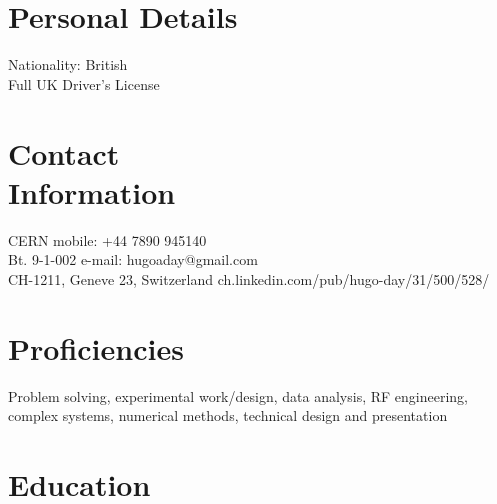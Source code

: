 \documentclass[margin,line]{resume}
\begin{document}
\begin{resume}

    \section{\mysidestyle Personal Details}
    Nationality: British \vspace{0mm}\\\vspace{-4.5mm}%
    Full UK Driver's License  \vspace{0mm}\\\vspace{-4.5mm}%


    \section{\mysidestyle Contact\\Information}
    CERN                            \hfill mobile: +44 7890 945140          \vspace{0mm}\\\vspace{0mm}%
    Bt. 9-1-002                          \hfill e-mail: hugoaday@gmail.com  \vspace{0mm}\\\vspace{-4.5mm}%
    CH-1211, Geneve 23, Switzerland      \hfill ch.linkedin.com/pub/hugo-day/31/500/528/%

    \section{\mysidestyle Proficiencies}

Problem solving, experimental work/design, data analysis, RF engineering, complex systems, numerical methods, technical design and presentation



    \section{\mysidestyle Education}


\end{resume}
\end{document}
